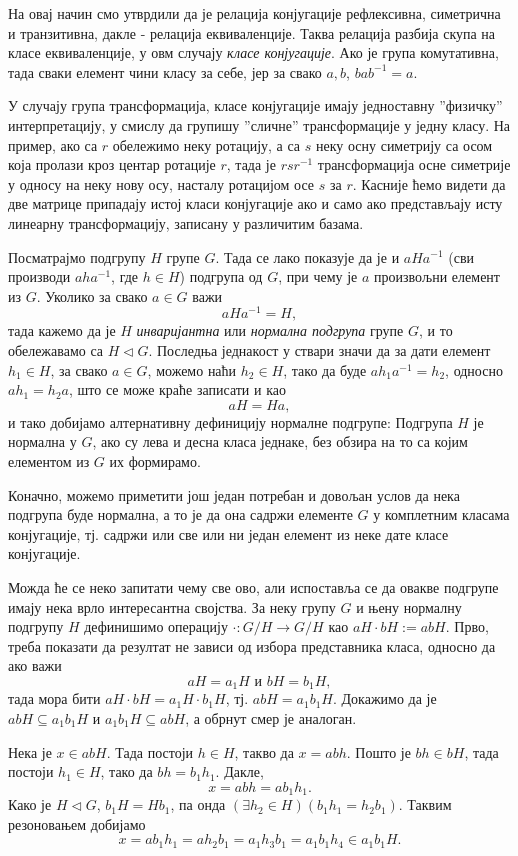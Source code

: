 \documentclass{report}
\theoremstyle{plain}
\theoremstyle{definition}
\begin{document}
На овај начин смо утврдили да је релација конјугације рефлексивна, симетрична и транзитивна, дакле - релација еквиваленције. Таква релација разбија скупа на класе еквиваленције, у овм случају \emph{класе конјугације}. Ако је група комутативна, тада сваки елемент чини класу за себе, јер за свако $a, b$, $bab^{-1} = a$.

У случају група трансформација, класе конјугације имају једноставну ''физичку'' интерпретацију, у смислу да групишу ''сличне'' трансформације у једну класу. На пример, ако са $r$ обележимо неку ротацију, а са $s$ неку осну симетрију са осом која пролази кроз центар ротације $r$, тада је $r s r^{-1}$ трансформација осне симетрије у односу на неку нову осу, насталу ротацијом осе $s$ за $r$. Касније ћемо видети да две матрице припадају истој класи конјугације ако и само ако представљају исту линеарну трансформацију, записану у различитим базама.

Посматрајмо подгрупу $H$ групе $G$. Тада се лако показује да је и $aHa^{-1}$ (сви производи $aha^{-1}$, где $h\in H$) подгрупа од $G$, при чему је $a$ произвољни елемент из $G$. Уколико за свако $a\in G$ важи
$$aHa^{-1} = H,$$
тада кажемо да је $H$ \emph{инваријантна} или \emph{нормална подгрупа} групе $G$, и то обележавамо са $H\lhd G$. Последња једнакост у ствари значи да за дати елемент $h_1\in H$, за свако $a\in G$, можемо наћи $h_2\in H$, тако да буде $ah_1a^{-1} = h_2$, односно $ah_1 = h_2 a$, што се може краће записати и као
$$aH = Ha, $$
и тако добијамо алтернативну дефиницију нормалне подгрупе: Подгрупа $H$ је нормална у $G$, ако су лева и десна класа једнаке, без обзира на то са којим елементом из $G$ их формирамо.

Коначно, можемо приметити још један потребан и довољан услов да нека подгрупа буде нормална, а то је да она садржи елементе $G$ у комплетним класама конјугације, тј. садржи или све или ни један елемент из неке дате класе конјугације.

Можда ће се неко запитати чему све ово, али испоставља се да овакве подгрупе имају нека врло интересантна својства. За неку групу $G$ и њену нормалну подгрупу $H$ дефинишимо операцију $\cdot: G/H \to G/H$ као $aH\cdot bH := abH$. Прво, треба показати да резултат не зависи од избора представника класа, односно да ако важи
$$aH = a_1 H \text{ и } bH = b_1 H,$$
тада мора бити $aH\cdot bH = a_1 H \cdot b_1 H$, тј. $abH = a_1 b_1 H$. Докажимо да је $abH \subseteq a_1 b_1 H$ и $a_1 b_1 H \subseteq abH$, а обрнут смер је аналоган.

Нека је $x\in abH$. Тада постоји $h\in H$, такво да $x=abh$. Пошто је $bh\in bH$, тада постоји $h_1\in H$, тако да $bh = b_1 h_1$. Дакле,
$$x = abh = ab_1 h_1.$$
Како је $H\lhd G$, $b_1 H = Hb_1$, па онда $(\exists h_2\in H)(b_1h_1=h_2b_1)$. Таквим резоновањем добијамо
$$x = ab_1h_1 = ah_2b_1 = a_1h_3b_1 = a_1b_1h_4 \in a_1b_1H.$$
\end{document}
